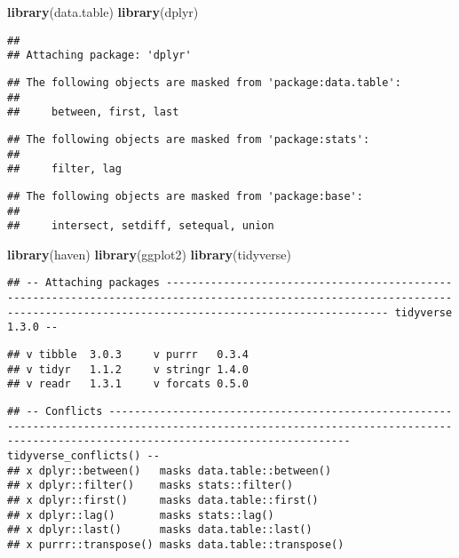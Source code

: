 \documentclass[
]{article}
\newenvironment{Shaded}{\begin{snugshade}}{\end{snugshade}}
\newcommand{\KeywordTok}[1]{\textcolor[rgb]{0.13,0.29,0.53}{\textbf{#1}}}
\newcommand{\NormalTok}[1]{#1}
\begin{document}
\begin{Shaded}
\begin{Highlighting}[]
\KeywordTok{library}\NormalTok{(data.table)}
\KeywordTok{library}\NormalTok{(dplyr)}
\end{Highlighting}
\end{Shaded}

\begin{verbatim}
## 
## Attaching package: 'dplyr'
\end{verbatim}

\begin{verbatim}
## The following objects are masked from 'package:data.table':
## 
##     between, first, last
\end{verbatim}

\begin{verbatim}
## The following objects are masked from 'package:stats':
## 
##     filter, lag
\end{verbatim}

\begin{verbatim}
## The following objects are masked from 'package:base':
## 
##     intersect, setdiff, setequal, union
\end{verbatim}

\begin{Shaded}
\begin{Highlighting}[]
\KeywordTok{library}\NormalTok{(haven)}
\KeywordTok{library}\NormalTok{(ggplot2)}
\KeywordTok{library}\NormalTok{(tidyverse)}
\end{Highlighting}
\end{Shaded}

\begin{verbatim}
## -- Attaching packages ------------------------------------------------------------------------------------------------------------------------------------------------------------------------------- tidyverse 1.3.0 --
\end{verbatim}

\begin{verbatim}
## v tibble  3.0.3     v purrr   0.3.4
## v tidyr   1.1.2     v stringr 1.4.0
## v readr   1.3.1     v forcats 0.5.0
\end{verbatim}

\begin{verbatim}
## -- Conflicts ---------------------------------------------------------------------------------------------------------------------------------------------------------------------------------- tidyverse_conflicts() --
## x dplyr::between()   masks data.table::between()
## x dplyr::filter()    masks stats::filter()
## x dplyr::first()     masks data.table::first()
## x dplyr::lag()       masks stats::lag()
## x dplyr::last()      masks data.table::last()
## x purrr::transpose() masks data.table::transpose()
\end{verbatim}
\end{document}
